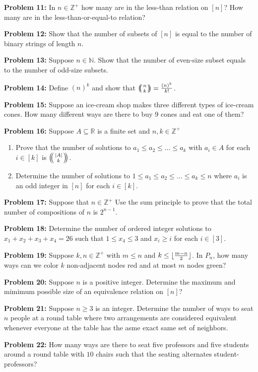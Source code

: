 \documentclass[12pt]{article}
\newcommand{\R}{\mathbb{R}}
\newcommand{\prob}[1]{\textbf{Problem #1:}}
\DeclarePairedDelimiter{\floor}{\lfloor}{\rfloor} %
\def\multiset#1#2{\ensuremath{\left(\kern-.3em\left(\genfrac{}{}{0pt}{}{#1}{#2}\right)\kern-.3em\right)}}
\begin{document}
\prob{11} In $n \in \mathbb{Z}^+$ how many are in the less-than relation on $[n]$? How many are in the less-than-or-equal-to relation?

\prob{12} Show that the number of subsets of $[n]$ is equal to the number of binary strings of length $n$.

\prob{13} Suppose $n \in \mathbb{N}$. Show that the number of even-size subset equals to the number of odd-size subsets.

\prob{14} Define $(n)^k$ and show that $\multiset{n}{k} = \frac{(n)^k}{k!}$.

\prob{15} Suppose an ice-cream shop makes three different types of ice-cream cones. How many different ways are there to buy $9$ cones and eat one of them?

\prob{16} Suppose $A \subseteq \R$ is a finite set and $n,k \in \mathbb{Z}^+$

\begin{enumerate}[label=(\alph*)]
    \item Prove that the number of solutions to $a_1 \le a_2 \le \dots \le a_k$ with $a_i \in A$ for each $i \in [k]$ is $\multiset{|A|}{k}$.
    \item Determine the number of solutions to $1 \le a_1 \le a_2 \le \dots \le a_k \le n$ where $a_i$ is an odd integer in $[n]$ for each $i \in [k]$.
\end{enumerate}

\prob{17} Suppose that $n \in \mathbb{Z}^+$ Use the sum principle to prove that the total number of compositions of $n$ is $2^{n-1}$.

\prob{18} Determine the number of ordered integer solutions to $x_1 + x_2 + x_3 + x_4 = 26$ such that $1 \le x_4 \le 3$ and $x_i \geq i$ for each $i\in [3]$.

\prob{19} Suppose $k, n \in \mathbb{Z}^+$ with $m \le n$ and $k \le \floor{\frac{m-n}{2}}$. In $P_n$, how many ways can we color $k$ non-adjacent nodes red and at most $m$ nodes green?

\prob{20} Suppose $n$ is a positive integer. Determine the maximum and mimimum possible size of an equivalence relation on $[n]$?

\prob{21} Suppose $n \geq 3$ is an integer. Determine the number of ways to seat $n$ people at a round table where two arrangements are considered equivalent whenever everyone at the table has the asme exact same set of neighbors.

\prob{22} How many ways are there to seat five professors and five students around a round table with $10$ chairs such that the seating alternates student-professors?
\end{document}

